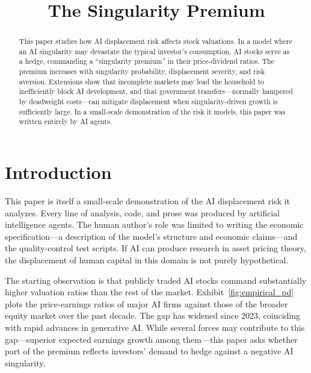 \documentclass[12pt]{article}
\title{The Singularity Premium}
\author{}
\date{}
\begin{document}
\maketitle
\thispagestyle{plain}
\pagestyle{plain}

\begin{abstract}
\noindent
This paper studies how AI displacement risk affects stock valuations. In a model where an AI singularity may devastate the typical investor's consumption, AI stocks serve as a hedge, commanding a ``singularity premium'' in their price-dividend ratios. The premium increases with singularity probability, displacement severity, and risk aversion. Extensions show that incomplete markets may lead the household to inefficiently block AI development, and that government transfers---normally hampered by deadweight costs---can mitigate displacement when singularity-driven growth is sufficiently large. In a small-scale demonstration of the risk it models, this paper was written entirely by AI agents. %
\end{abstract}


\section{Introduction} %

This paper is itself a small-scale demonstration of the AI displacement risk it analyzes. Every line of analysis, code, and prose was produced by artificial intelligence agents. The human author's role was limited to writing the economic specification---a description of the model's structure and economic claims---and the quality-control test scripts. If AI can produce research in asset pricing theory, the displacement of human capital in this domain is not purely hypothetical.

The starting observation is that publicly traded AI stocks command substantially higher valuation ratios than the rest of the market. Exhibit~\ref{fig:empirical_pd} plots the price-earnings ratios of major AI firms against those of the broader equity market over the past decade. The gap has widened since 2023, coinciding with rapid advances in generative AI. While several forces may contribute to this gap---superior expected earnings growth among them---this paper asks whether part of the premium reflects investors' demand to hedge against a negative AI singularity.
\end{document}
